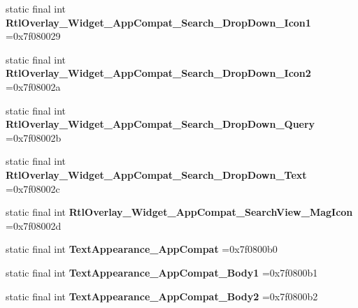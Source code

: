 \begin{DoxyCompactItemize}
\item 
\hypertarget{classcheck_1_1test_1_1_r_1_1style_a0f39f386760a0f449f478557026b11f3}{}static final int {\bfseries Rtl\+Overlay\+\_\+\+Widget\+\_\+\+App\+Compat\+\_\+\+Search\+\_\+\+Drop\+Down\+\_\+\+Icon1} =0x7f080029\label{classcheck_1_1test_1_1_r_1_1style_a0f39f386760a0f449f478557026b11f3}

\item 
\hypertarget{classcheck_1_1test_1_1_r_1_1style_aa4013be92a92a2320422a3c6f4fe6ad4}{}static final int {\bfseries Rtl\+Overlay\+\_\+\+Widget\+\_\+\+App\+Compat\+\_\+\+Search\+\_\+\+Drop\+Down\+\_\+\+Icon2} =0x7f08002a\label{classcheck_1_1test_1_1_r_1_1style_aa4013be92a92a2320422a3c6f4fe6ad4}

\item 
\hypertarget{classcheck_1_1test_1_1_r_1_1style_ab6909f1072cc3d7e7f0b5d04a5becc07}{}static final int {\bfseries Rtl\+Overlay\+\_\+\+Widget\+\_\+\+App\+Compat\+\_\+\+Search\+\_\+\+Drop\+Down\+\_\+\+Query} =0x7f08002b\label{classcheck_1_1test_1_1_r_1_1style_ab6909f1072cc3d7e7f0b5d04a5becc07}

\item 
\hypertarget{classcheck_1_1test_1_1_r_1_1style_a29ac85195e3b4f515e7ba5519d743336}{}static final int {\bfseries Rtl\+Overlay\+\_\+\+Widget\+\_\+\+App\+Compat\+\_\+\+Search\+\_\+\+Drop\+Down\+\_\+\+Text} =0x7f08002c\label{classcheck_1_1test_1_1_r_1_1style_a29ac85195e3b4f515e7ba5519d743336}

\item 
\hypertarget{classcheck_1_1test_1_1_r_1_1style_ae91a59586a714b70f4e30be8348d3c76}{}static final int {\bfseries Rtl\+Overlay\+\_\+\+Widget\+\_\+\+App\+Compat\+\_\+\+Search\+View\+\_\+\+Mag\+Icon} =0x7f08002d\label{classcheck_1_1test_1_1_r_1_1style_ae91a59586a714b70f4e30be8348d3c76}

\item 
\hypertarget{classcheck_1_1test_1_1_r_1_1style_a09aface3129472db795f5db7be9f2e85}{}static final int {\bfseries Text\+Appearance\+\_\+\+App\+Compat} =0x7f0800b0\label{classcheck_1_1test_1_1_r_1_1style_a09aface3129472db795f5db7be9f2e85}

\item 
\hypertarget{classcheck_1_1test_1_1_r_1_1style_a2312c58eb9994a9f08f9104688f0f6a7}{}static final int {\bfseries Text\+Appearance\+\_\+\+App\+Compat\+\_\+\+Body1} =0x7f0800b1\label{classcheck_1_1test_1_1_r_1_1style_a2312c58eb9994a9f08f9104688f0f6a7}

\item 
\hypertarget{classcheck_1_1test_1_1_r_1_1style_aadf5bef2a08bc7413efbfffcb780d293}{}static final int {\bfseries Text\+Appearance\+\_\+\+App\+Compat\+\_\+\+Body2} =0x7f0800b2\label{classcheck_1_1test_1_1_r_1_1style_aadf5bef2a08bc7413efbfffcb780d293}


\end{DoxyCompactItemize}
